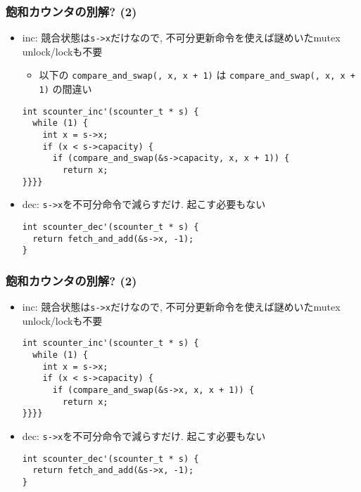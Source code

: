 \documentclass[12pt,dvipdfmx]{beamer}
\begin{document}
\begin{frame}[fragile]
  \frametitle{飽和カウンタの別解? (2)}
  \begin{itemize}
  \item inc: 競合状態は{\tt s->x}だけなので,
    不可分更新命令を使えば謎めいたmutex unlock/lockも不要
    \begin{itemize}
    \item 
      {\small {} 以下の
        {\tt compare\_and\_swap(, x, x + 1)}
        は
        {\tt compare\_and\_swap(, x, x + 1)}
        の間違い}
    \end{itemize}
\begin{lstlisting}
int scounter_inc'(scounter_t * s) {
  while (1) {
    int x = s->x;
    if (x < s->capacity) {
      if (compare_and_swap(&s->capacity, x, x + 1)) {
        return x;
}}}}
\end{lstlisting}

\item dec: {\tt s->x}を不可分命令で減らすだけ. 起こす必要もない
\begin{lstlisting}
int scounter_dec'(scounter_t * s) {
  return fetch_and_add(&s->x, -1);
}
\end{lstlisting}
\end{itemize}
\end{frame}

\begin{frame}[fragile]
  \frametitle{飽和カウンタの別解? (2)}
  \begin{itemize}
  \item inc: 競合状態は{\tt s->x}だけなので,
    不可分更新命令を使えば謎めいたmutex unlock/lockも不要
\begin{lstlisting}
int scounter_inc'(scounter_t * s) {
  while (1) {
    int x = s->x;
    if (x < s->capacity) {
      if (compare_and_swap(&s->x, x, x + 1)) {
        return x;
}}}}
\end{lstlisting}

\item dec: {\tt s->x}を不可分命令で減らすだけ. 起こす必要もない
\begin{lstlisting}
int scounter_dec'(scounter_t * s) {
  return fetch_and_add(&s->x, -1);
}
\end{lstlisting}
\end{itemize}
\end{frame}
\end{document}
